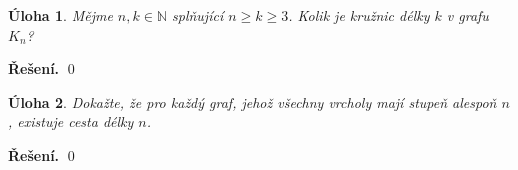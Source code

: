 \documentclass{article}
\newtheorem{uloha}{Úloha}
\newcommand{\N}{\mathbb{N}}
\newenvironment{reseni}{\noindent\textbf{Řešení.}\hspace{0.5em}}{\hfill\qed\medskip}
\begin{document}
\begin{uloha}
Mějme $n, k \in \N$ splňující $n \geq k \geq 3$. Kolik je kružnic délky $k$ v grafu $K_n$?
\end{uloha}
\begin{reseni}
\end{reseni}
\begin{uloha}
Dokažte, že pro každý graf, jehož všechny vrcholy mají stupeň alespoň $n$, existuje cesta délky $n$.
\end{uloha}
\begin{reseni}
\end{reseni}
\end{document}
